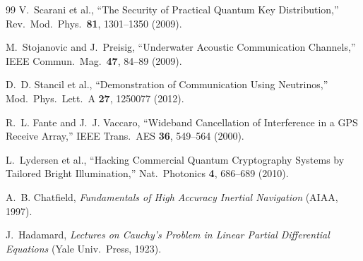 \documentclass[twocolumn,superscriptaddress,prd,nofootinbib]{revtex4-2}
\begin{document}
\begin{thebibliography}{99}
V.~Scarani et al., ``The Security of Practical Quantum Key
Distribution,'' Rev.\ Mod.\ Phys.\ \textbf{81}, 1301--1350 (2009).

M.~Stojanovic and J.~Preisig, ``Underwater Acoustic Communication
Channels,'' IEEE Commun.\ Mag.\ \textbf{47}, 84--89 (2009).

D.~D. Stancil et al., ``Demonstration of Communication Using
Neutrinos,'' Mod.\ Phys.\ Lett.\ A \textbf{27}, 1250077 (2012).

R.~L. Fante and J.~J. Vaccaro, ``Wideband Cancellation of
Interference in a GPS Receive Array,'' IEEE Trans.\ AES \textbf{36},
549--564 (2000).

L.~Lydersen et al., ``Hacking Commercial Quantum Cryptography Systems
by Tailored Bright Illumination,'' Nat.\ Photonics \textbf{4},
686--689 (2010).

A.~B. Chatfield, \textit{Fundamentals of High Accuracy Inertial
Navigation} (AIAA, 1997).

J.~Hadamard, \textit{Lectures on Cauchy's Problem in Linear Partial
Differential Equations} (Yale Univ.\ Press, 1923).

\end{thebibliography}
\end{document}
